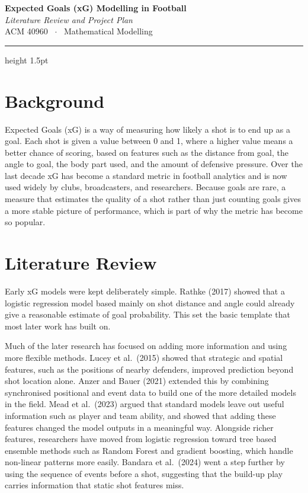 \documentclass[11pt]{article}
\begin{document}
\begin{center}
  {\LARGE\bfseries\color{navy} Expected Goals (xG) Modelling in Football}\\[5pt]
  {\large\itshape\color{grey} Literature Review and Project Plan}\\[3pt]
  {\small\color{grey} ACM 40960 \ $\cdot$ \ Mathematical Modelling}
\end{center}
\vspace{4pt}
{\color{navy}\hrule height 1.5pt}
\vspace{10pt}

\section*{Background}

Expected Goals (xG) is a way of measuring how likely a shot is to end up as a
goal. Each shot is given a value between 0 and 1, where a higher value means a
better chance of scoring, based on features such as the distance from goal, the
angle to goal, the body part used, and the amount of defensive pressure. Over
the last decade xG has become a standard metric in football analytics and is now
used widely by clubs, broadcasters, and researchers. Because goals are rare, a
measure that estimates the quality of a shot rather than just counting goals
gives a more stable picture of performance, which is part of why the metric has
become so popular.

\section*{Literature Review}

Early xG models were kept deliberately simple. Rathke (2017) showed that a
logistic regression model based mainly on shot distance and angle could already
give a reasonable estimate of goal probability. This set the basic template that
most later work has built on.

Much of the later research has focused on adding more information and using more
flexible methods. Lucey et al.\ (2015) showed that strategic and spatial
features, such as the positions of nearby defenders, improved prediction beyond
shot location alone. Anzer and Bauer (2021) extended this by combining
synchronised positional and event data to build one of the more detailed models
in the field. Mead et al.\ (2023) argued that standard models leave out useful
information such as player and team ability, and showed that adding these
features changed the model outputs in a meaningful way. Alongside richer
features, researchers have moved from logistic regression toward tree based
ensemble methods such as Random Forest and gradient boosting, which handle
non-linear patterns more easily. Bandara et al.\ (2024) went a step further by
using the sequence of events before a shot, suggesting that the build-up play
carries information that static shot features miss.
\end{document}
